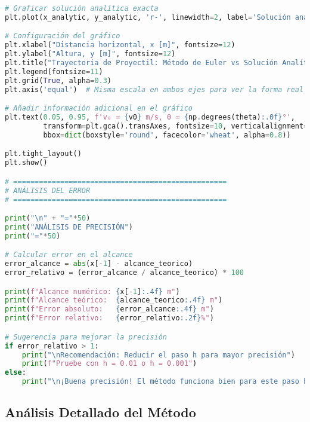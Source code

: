 \documentclass[12pt,a4paper]{article}
\begin{document}
\begin{lstlisting}[language=Python, basicstyle=\small\ttfamily]
# Graficar solución analítica exacta
plt.plot(x_analytic, y_analytic, 'r-', linewidth=2, label='Solución analítica')

# Configuración del gráfico
plt.xlabel("Distancia horizontal, x [m]", fontsize=12)
plt.ylabel("Altura, y [m]", fontsize=12)
plt.title("Trayectoria de Proyectil: Método de Euler vs Solución Analítica", fontsize=14)
plt.legend(fontsize=11)
plt.grid(True, alpha=0.3)
plt.axis('equal')  # Misma escala en ambos ejes para ver la forma real

# Añadir información adicional en el gráfico
plt.text(0.05, 0.95, f'v₀ = {v0} m/s, θ = {np.degrees(theta):.0f}°', 
         transform=plt.gca().transAxes, fontsize=10, verticalalignment='top',
         bbox=dict(boxstyle='round', facecolor='wheat', alpha=0.8))

plt.tight_layout()
plt.show()

# ==================================================
# ANÁLISIS DEL ERROR
# ==================================================

print("\n" + "="*50)
print("ANÁLISIS DE PRECISIÓN")
print("="*50)

# Calcular error en el alcance
error_alcance = abs(x[-1] - alcance_teorico)
error_relativo = (error_alcance / alcance_teorico) * 100

print(f"Alcance numérico: {x[-1]:.4f} m")
print(f"Alcance teórico:  {alcance_teorico:.4f} m")
print(f"Error absoluto:   {error_alcance:.4f} m")
print(f"Error relativo:   {error_relativo:.2f}%")

# Sugerencia para mejorar la precisión
if error_relativo > 1:
    print("\nRecomendación: Reducir el paso h para mayor precisión")
    print(f"Pruebe con h = 0.01 o h = 0.001")
else:
    print("\n¡Buena precisión! El método funciona bien para este paso h")
\end{lstlisting}

\subsection*{Análisis Detallado del Método}
\end{document}
